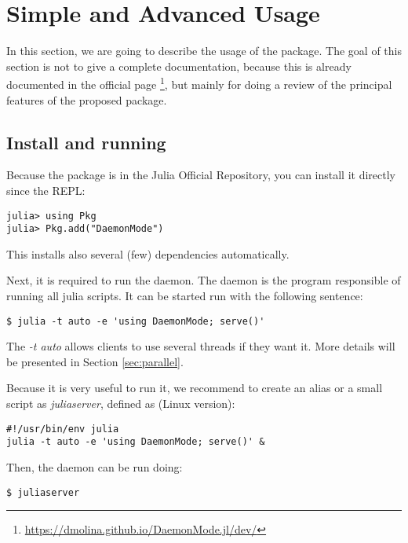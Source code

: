 \documentclass{juliacon}
\begin{document}
\section{Simple and Advanced Usage}
\label{sec:usage}

In this section, we are going to describe the usage of the package. The goal of
this section is not to give a complete documentation, because this is already
documented in the official page
\footnote{\url{https://dmolina.github.io/DaemonMode.jl/dev/}}, but mainly for
doing a review of the principal features of the proposed package.

\subsection{Install and running}
\label{sec:install}

Because the package is in the Julia Official Repository, you can install it 
directly since the REPL:


\begin{minipage}[\textwidth]{\linewidth}
  \begin{lstlisting}
julia> using Pkg
julia> Pkg.add("DaemonMode")
  \end{lstlisting}
\end{minipage}

This installs also several (few) dependencies automatically.

Next, it is required to run the daemon. The daemon is the program responsible of
running all julia scripts. It can be started run with the following sentence:

\begin{lstlisting}
$ julia -t auto -e 'using DaemonMode; serve()'
\end{lstlisting}

The \textit{-t auto} allows clients to use several threads if they want it. More
details will be presented in Section \ref{sec:parallel}.

Because it is very useful to run it, we recommend to create an alias or a small 
script as \textit{juliaserver}, defined as (Linux version):

\begin{lstlisting}
#!/usr/bin/env julia
julia -t auto -e 'using DaemonMode; serve()' &  
\end{lstlisting}

Then, the daemon can be run doing:

\begin{lstlisting}
$ juliaserver
\end{lstlisting}
\end{document}
